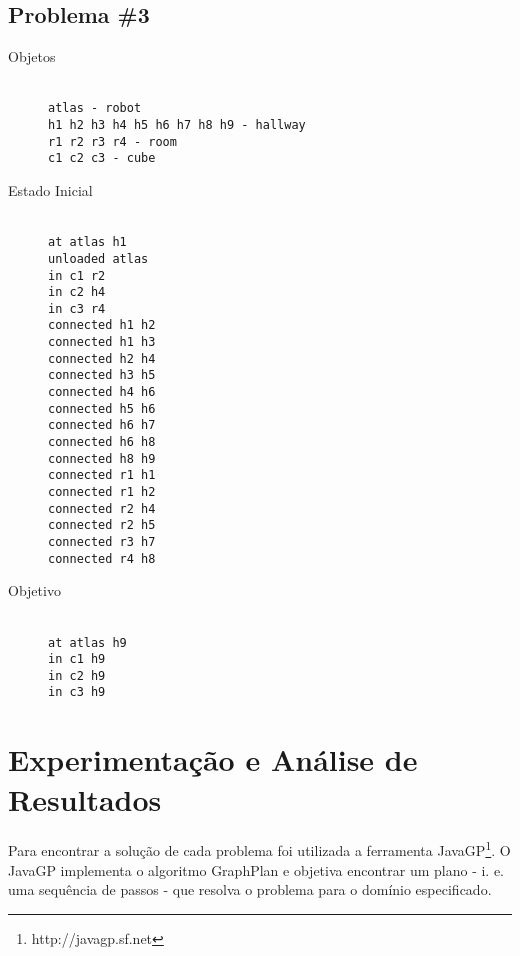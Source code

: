 \documentclass[letterpaper]{article}
\begin{document}
\subsection{Problema \#3}
\begin{description}
  \item[Objetos]\hfill\\
    \texttt{atlas - robot\\h1 h2 h3 h4 h5 h6 h7 h8 h9 - hallway\\r1 r2 r3 r4 - room\\c1 c2 c3 - cube}
  \item[Estado Inicial]\hfill\\
    \texttt{at atlas h1\\unloaded atlas\\in c1 r2\\in c2 h4\\in c3 r4\\connected h1 h2\\connected h1 h3\\connected h2 h4\\connected h3 h5\\connected h4 h6\\connected h5 h6\\connected h6 h7\\connected h6 h8\\connected h8 h9\\connected r1 h1\\connected r1 h2\\connected r2 h4\\connected r2 h5\\connected r3 h7\\connected r4 h8}
  \item[Objetivo]\hfill\\
    \texttt{at atlas h9\\in c1 h9\\in c2 h9\\in c3 h9}
\end{description}

\section{Experimentação e Análise de Resultados}

Para encontrar a solução de cada problema foi utilizada a ferramenta JavaGP\footnote{http://javagp.sf.net}. O JavaGP 
implementa o algoritmo GraphPlan e objetiva encontrar um plano - i. e. uma sequência de passos - que resolva o 
problema para o domínio especificado.
\end{document}
